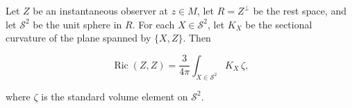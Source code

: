 Let $Z$ be an instantaneous observer at $z \in M$, let $R = Z^\perp$ be the rest space, and let $\mathcal{S}^2$ be the unit sphere in $R$. For each $X \in \mathcal{S}^2$, let $K_X$ be the sectional curvature of the plane spanned by $\{X, Z\}$. Then

$$\operatorname{Ric}(Z, Z) = \frac{3}{4\pi} \int_{X \in \mathcal{S}^2} K_X \, \zeta,$$

where $\zeta$ is the standard volume element on $\mathcal{S}^2$.
